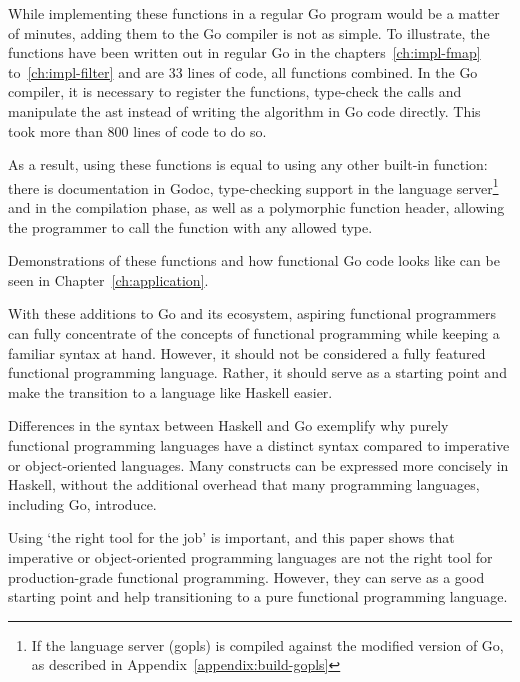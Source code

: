 While implementing these functions in a regular Go program would be a matter of minutes,
adding them to the Go compiler is not as simple. To illustrate, the functions
have been written out in regular Go in the chapters~\ref{ch:impl-fmap} to~\ref{ch:impl-filter}
and are 33 lines of code, all functions combined. In the Go compiler, it is necessary to
register the functions, type-check the calls and manipulate the \gls{ast} instead of writing
the algorithm in Go code directly. This took more than 800 lines of code to do so.

As a result, using these functions is equal to using any other built-in function: there
is documentation in Godoc, type-checking support in the language server\footnote{If the
language server (gopls) is compiled against the modified version of Go, as
described in Appendix~\ref{appendix:build-gopls}}
and in the compilation phase, as well as a polymorphic function header, allowing the
programmer to call the function with any allowed type.

Demonstrations of these functions and how functional Go code looks like can be seen in
Chapter~\ref{ch:application}.

With these additions to Go and its ecosystem, aspiring functional programmers
can fully concentrate of the concepts of functional programming while keeping
a familiar syntax at hand. However, it should not be considered a fully featured
functional programming language. Rather, it should serve as a starting point and
make the transition to a language like Haskell easier.

Differences in the syntax between Haskell and Go exemplify why purely functional programming
languages have a distinct syntax compared to imperative or object-oriented languages.
Many constructs can be expressed more concisely in Haskell, without the additional
overhead that many programming languages, including Go, introduce.

Using `the right tool for the job' is important, and this paper shows that imperative or
object-oriented programming languages are not the right tool for production-grade
functional programming. However, they can serve as a good starting point and help transitioning
to a pure functional programming language.
